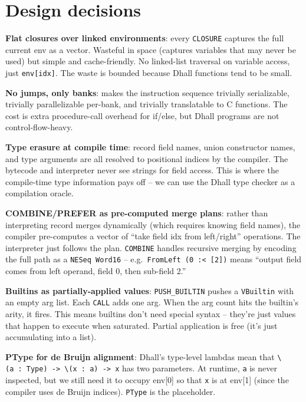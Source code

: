 \documentclass[]{article}
\begin{document}
\section{Design decisions}\label{design-decisions}

\textbf{Flat closures over linked environments}: every \texttt{CLOSURE} captures
the full current env as a vector. Wasteful in space (captures variables that may
never be used) but simple and cache-friendly. No linked-list traversal on
variable access, just \texttt{env{[}idx{]}}. The waste is bounded because Dhall
functions tend to be small.

\textbf{No jumps, only banks}: makes the instruction sequence trivially
serializable, trivially parallelizable per-bank, and trivially translatable to C
functions. The cost is extra procedure-call overhead for if/else, but Dhall
programs are not control-flow-heavy.

\textbf{Type erasure at compile time}: record field names, union constructor
names, and type arguments are all resolved to positional indices by the
compiler. The bytecode and interpreter never see strings for field access. This
is where the compile-time type information pays off -- we can use the Dhall type
checker as a compilation oracle.

\textbf{COMBINE/PREFER as pre-computed merge plans}: rather than interpreting
record merges dynamically (which requires knowing field names), the compiler
pre-computes a vector of ``take field idx from left/right'' operations. The
interpreter just follows the plan. \texttt{COMBINE} handles recursive merging by
encoding the full path as a \texttt{NESeq\ Word16} --
e.g.~\texttt{FromLeft\ (0\ :\textless{}\textbar{}\textbar{}\ {[}2{]})} means
``output field comes from left operand, field 0, then sub-field 2.''

\textbf{Builtins as partially-applied values}: \texttt{PUSH\_BUILTIN} pushes a
\texttt{VBuiltin} with an empty arg list. Each \texttt{CALL} adds one arg. When
the arg count hits the builtin's arity, it fires. This means builtins don't need
special syntax -- they're just values that happen to execute when saturated.
Partial application is free (it's just accumulating into a list).

\textbf{PType for de Bruijn alignment}: Dhall's type-level lambdas mean that
\texttt{\textbackslash{}(a\ :\ Type)\ -\textgreater{}\ \textbackslash{}(x\ :\ a)\ -\textgreater{}\ x}
has two parameters. At runtime, \texttt{a} is never inspected, but we still need
it to occupy env{[}0{]} so that \texttt{x} is at env{[}1{]} (since the compiler
uses de Bruijn indices). \texttt{PType} is the placeholder.
\end{document}
